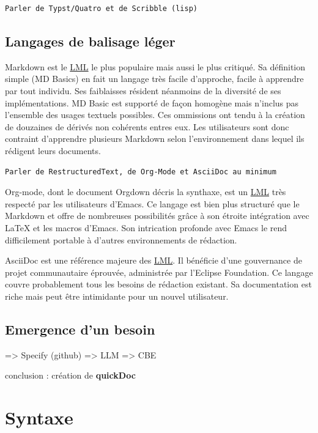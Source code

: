 \documentclass[a4paper,12pt]{article}
\begin{document}
\begin{verbatim}
Parler de Typst/Quatro et de Scribble (lisp)
\end{verbatim}
\subsection{Langages de balisage léger}
\label{sec:orgf12d34a}
Markdown est le \protect\hyperlink{gls-1}{\label{gls-1-use-2}LML} le plus populaire mais aussi le plus critiqué. Sa définition simple (MD Basics) en fait un langage très facile d'approche, facile à apprendre par tout individu. Ses faiblaisses résident néanmoins de la diversité de ses implémentations. MD Basic est supporté de façon homogène mais n'inclus pas l'ensemble des usages textuels possibles. Ces ommissions ont tendu à la création de douzaines de dérivés non cohérents entres eux. Les utilisateurs sont donc contraint d'apprendre plusieurs Markdown selon l'environnement dans lequel ils rédigent leurs documents.

\begin{verbatim}
Parler de RestructuredText, de Org-Mode et AsciiDoc au minimum
\end{verbatim}

Org-mode, dont le document Orgdown décris la synthaxe, est un \protect\hyperlink{gls-1}{\label{gls-1-use-3}LML} très respecté par les utilisateurs d'Emacs. Ce langage est bien plus structuré que le Markdown et offre de nombreuses possibilités grâce à son étroite intégration avec \LaTeX{} et les macros d'Emacs. Son intrication profonde avec Emacs le rend difficilement portable à d'autres environnements de rédaction.

AsciiDoc est une référence majeure des \protect\hyperlink{gls-1}{\label{gls-1-use-4}LML}. Il bénéficie d'une gouvernance de projet communautaire éprouvée, administrée par l'Eclipse Foundation. Ce langage couvre probablement tous les besoins de rédaction existant. Sa documentation est riche mais peut être intimidante pour un nouvel utilisateur.
\subsection{Emergence d'un besoin}
\label{sec:org3b4e94e}
=> Specify (github)
=> LLM
=> CBE

conclusion : création de \textbf{quickDoc}
\section{Syntaxe}
\label{sec:orgdb802e5}
\end{document}
